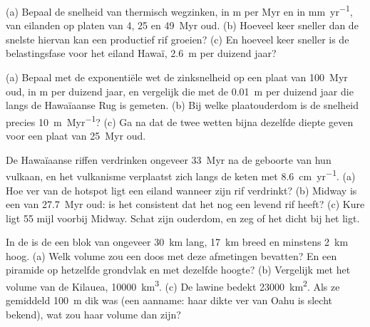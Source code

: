 \begin{exercise}[$\star\star$]\label{exo:b2:oceanic-islands:5}
(a) Bepaal de snelheid van thermisch wegzinken, in \unit{m} per \unit{Myr} en in \unit{mm.yr^{-1}}, van
eilanden op platen van 4, 25 en \qty{49}{Myr} oud. (b) Hoeveel keer sneller dan de snelste hiervan
kan een productief rif groeien? (c) En hoeveel keer sneller is de belastingsfase voor het eiland
Hawaï, \qty{2.6}{m} per duizend jaar?
\end{exercise}

\begin{exercise}[$\star\star$]\label{exo:b2:oceanic-islands:6}
(a) Bepaal met de exponentiële wet de zinksnelheid op een plaat van \qty{100}{Myr} oud, in \unit{m}
per duizend jaar, en vergelijk die met de \qty{0.01}{m} per duizend jaar die langs de
Hawaïaanse Rug is gemeten. (b) Bij welke plaatouderdom is de snelheid precies \qty{10}{m.Myr^{-1}}? (c) Ga na dat de
twee wetten bijna dezelfde diepte geven voor een plaat van \qty{25}{Myr} oud.
\end{exercise}

\begin{exercise}[$\star\star$]\label{exo:b2:oceanic-islands:7}
De Hawaïaanse riffen verdrinken ongeveer \qty{33}{Myr} na de geboorte van hun vulkaan, en het vulkanisme verplaatst zich
langs de keten met \qty{8.6}{cm.yr^{-1}}. (a) Hoe ver van de hotspot ligt een eiland wanneer zijn
rif verdrinkt? (b) Midway is een  van \qty{27.7}{Myr} oud: is het consistent dat het nog een
levend rif heeft? (c) Kure ligt 55 mijl voorbij Midway. Schat zijn ouderdom, en zeg of het dicht
bij het  ligt.
\end{exercise}

\begin{exercise}[$\star\star$]\label{exo:b2:oceanic-islands:8}
In de  is de  een blok van ongeveer \qty{30}{km} lang,
\qty{17}{km} breed en minstens \qty{2}{km} hoog. (a) Welk volume zou een doos met deze afmetingen
bevatten? En een piramide op hetzelfde grondvlak en met dezelfde hoogte? (b) Vergelijk met het volume van de
Kilauea, \qty{10000}{km^3}. (c) De lawine bedekt \qty{23000}{km^2}. Als ze gemiddeld
\qty{100}{m} dik was (een aanname: haar dikte ver van Oahu is slecht bekend), wat zou haar
volume dan zijn?
\end{exercise}


